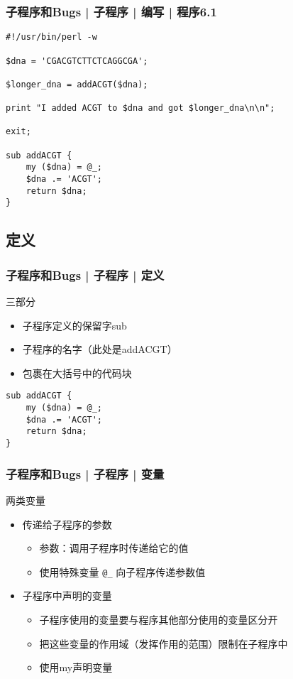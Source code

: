 \begin{frame}[fragile]
  \frametitle{子程序和Bugs | 子程序 | 编写 | \alert{程序6.1}}
  \vspace{-0.5em}
\begin{lstlisting}
#!/usr/bin/perl -w

$dna = 'CGACGTCTTCTCAGGCGA';

$longer_dna = addACGT($dna);

print "I added ACGT to $dna and got $longer_dna\n\n";

exit;

sub addACGT {
    my ($dna) = @_;
    $dna .= 'ACGT';
    return $dna;
}
\end{lstlisting}
\end{frame}

\subsection{定义}
\begin{frame}[fragile]
  \frametitle{子程序和Bugs | 子程序 | \alert{定义}}
  \begin{block}{三部分}
    \begin{itemize}
      \item 子程序定义的保留字sub
      \item 子程序的名字（此处是addACGT）
      \item 包裹在大括号中的代码块
    \end{itemize}
  \end{block}
\begin{lstlisting}
sub addACGT {
    my ($dna) = @_;
    $dna .= 'ACGT';
    return $dna;
}
\end{lstlisting}
\end{frame}

\begin{frame}[fragile]
  \frametitle{子程序和Bugs | 子程序 | \alert{变量}}
  \begin{block}{两类变量}
    \begin{itemize}
      \item 传递给子程序的参数
	\begin{itemize}
	  \item 参数：调用子程序时传递给它的值
	  \item 使用特殊变量 \verb|@_| 向子程序传递参数值
	\end{itemize}
      \item 子程序中声明的变量
	\begin{itemize}
	  \item 子程序使用的变量要与程序其他部分使用的变量区分开
	  \item 把这些变量的作用域（发挥作用的范围）限制在子程序中
	  \item 使用my声明变量
	\end{itemize}
    \end{itemize}
  \end{block}
\end{frame}

